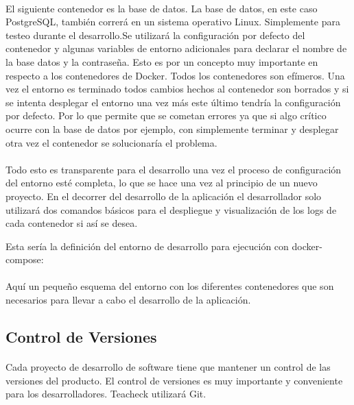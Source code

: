 \paragraph{}
El siguiente contenedor es la base de datos. La base de datos, en este caso PostgreSQL, también correrá en un sistema operativo Linux. Simplemente para testeo durante el desarrollo.Se utilizará la configuración por defecto del contenedor y algunas variables de entorno adicionales para declarar el nombre de la base datos y la contraseña. Esto es por un concepto muy importante en respecto a los contenedores de Docker. Todos los contenedores son efímeros. Una vez el entorno es terminado todos cambios hechos al contenedor son borrados y si se intenta desplegar el entorno una vez más este último tendría la configuración por defecto. Por lo que permite que se cometan errores ya que si algo crítico ocurre con la base de datos por ejemplo, con simplemente terminar y desplegar otra vez el contenedor se solucionaría el problema.

\paragraph{}
Todo esto es transparente para el desarrollo una vez el proceso de configuración del entorno esté completa, lo que se hace una vez al principio de un nuevo proyecto. En el decorrer del desarrollo de la aplicación el desarrollador solo utilizará dos comandos básicos para el despliegue y visualización de los logs de cada contenedor si así se desea.

Esta sería la definición del entorno de desarrollo para ejecución con docker-compose:

\paragraph{}
Aquí un pequeño esquema del entorno con los diferentes contenedores que son necesarios para llevar a cabo el desarrollo de la aplicación.

\subsection{Control de Versiones}
\paragraph{}
Cada proyecto de desarrollo de software tiene que mantener un control de las versiones del producto. El control de versiones es muy importante y conveniente para los desarrolladores.
Teacheck utilizará Git.

